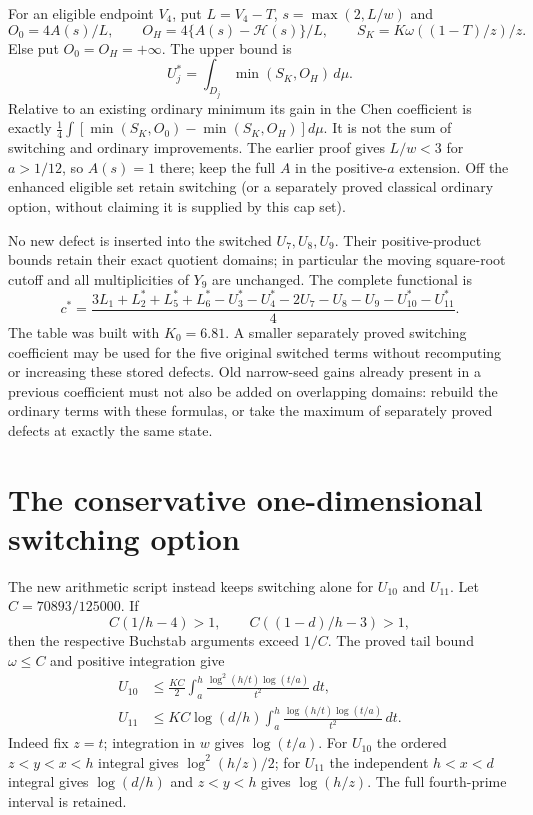\documentclass[11pt]{article}
\newcommand{\HH}{\mathcal H}
\begin{document}
For an eligible endpoint $V_4$, put $L=V_4-T$,
$s=\max(2,L/w)$ and
\[
 O_0=4A(s)/L,\qquad O_H=4\{A(s)-\HH(s)\}/L,
 \qquad S_K=K\omega((1-T)/z)/z.
\]
Else put $O_0=O_H=+\infty$. The upper bound is
\begin{equation}\label{eq:four}
 U_j^*=\int_{D_j}\min(S_K,O_H)\,d\mu.
\end{equation}
Relative to an existing ordinary minimum its gain in the Chen
coefficient is exactly
$\frac14\int[\min(S_K,O_0)-\min(S_K,O_H)]d\mu$.
It is not the sum of switching and ordinary improvements.
The earlier proof gives $L/w<3$ for $a>1/12$, so $A(s)=1$ there;
keep the full $A$ in the positive-$a$ extension. Off the enhanced
eligible set retain switching (or a separately proved classical
ordinary option, without claiming it is supplied by this cap set).

No new defect is inserted into the switched $U_7,U_8,U_9$.
Their positive-product bounds retain their exact quotient domains;
in particular the moving square-root cutoff and all multiplicities
of $Y_9$ are unchanged. The complete functional is
\[
 c^*=\frac{3L_1+L_2^*+L_5^*+L_6^*-U_3^*-U_4^*
                    -2U_7-U_8-U_9-U_{10}^*-U_{11}^*}{4}.
\]
The table was built with $K_0=6.81$. A smaller separately proved
switching coefficient may be used for the five original switched
terms without recomputing or increasing these stored defects.
Old narrow-seed gains already present in a previous coefficient
must not also be added on overlapping domains: rebuild the ordinary
terms with these formulas, or take the maximum of separately proved
defects at exactly the same state.

\section*{The conservative one-dimensional switching option}
The new arithmetic script instead keeps switching alone for $U_{10}$
and $U_{11}$. Let $C=70893/125000$. If
\[
 C(1/h-4)>1,\qquad C((1-d)/h-3)>1,
\]
then the respective Buchstab arguments exceed $1/C$.
The proved tail bound $\omega\le C$ and positive integration give
\begin{align*}
 U_{10}&\le\frac{KC}{2}\int_a^h
       \frac{\log^2(h/t)\log(t/a)}{t^2}\,dt,\\
 U_{11}&\le KC\log(d/h)\int_a^h
       \frac{\log(h/t)\log(t/a)}{t^2}\,dt.
\end{align*}
Indeed fix $z=t$; integration in $w$ gives $\log(t/a)$.
For $U_{10}$ the ordered $z<y<x<h$ integral gives
$\log^2(h/z)/2$; for $U_{11}$ the independent $h<x<d$
integral gives $\log(d/h)$ and $z<y<h$ gives $\log(h/z)$.
The full fourth-prime interval is retained.
\end{document}
